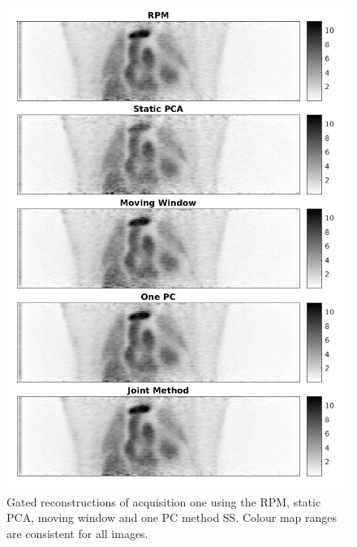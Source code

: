             \begin{figure}
                \centering
                
                \includegraphics[width=0.8\linewidth]{figures/data_driven_surrogate_signal_extraction_results_1_visual_analysis_pca.png}
                
                \captionsetup{singlelinecheck=false, justification=centering}
                \caption{Gated reconstructions of acquisition one using the \gls{RPM}, static \gls{PCA}, moving window and one \gls{PC} method \gls{SS}. Colour map ranges are consistent for all images.}
                \label{fig:pca_data_driven_surrogate_signal_extraction_methods_for_Dynamic_pet_visual_analysis}
            \end{figure}
            
